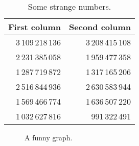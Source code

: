\begin{table} [bt]
\centering
\caption{Some strange numbers.}
\begin{tabular}{rr}
\toprule
First column & Second column \\
\midrule
3\,109\,218\,136 & 3\,208\,415\,108 \\
2\,231\,385\,058 & 1\,959\,477\,358 \\
1\,287\,719\,872 & 1\,317\,165\,206 \\
2\,516\,844\,936 & 2\,630\,583\,944 \\
1\,569\,466\,774 & 1\,636\,507\,220 \\
1\,032\,627\,816 &    991\,322\,491 \\
\bottomrule
\end{tabular}
\label{tbl:randomnumbers}
\end{table}

\begin{figure} [bt]
  \centering
  \caption{A funny graph.}
  \label{fig:somegraph}
\end{figure}
